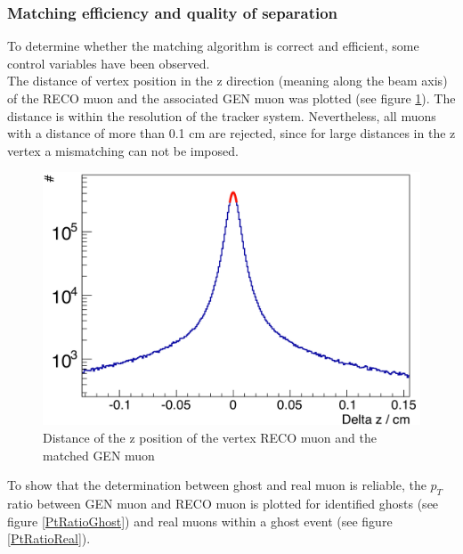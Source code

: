 \subsubsection{Matching efficiency and quality of separation}
To determine whether the matching algorithm is correct and efficient, some control variables have been observed.\\
The distance of vertex position in the z direction (meaning along the beam axis) of the RECO muon and the associated GEN muon was plotted (see figure \ref{DeltaZMatching}). The distance is within the resolution of the tracker system. Nevertheless, all muons with a distance of more than 0.1 cm are rejected, since for large distances in the z vertex a mismatching can not be imposed.\\
\begin{figure}[b]
\centering
\begin{minipage}[t]{0.95\textwidth}
\includegraphics[width=\textwidth]{Figures/scheuch/DeltaZ.png}
\caption{Distance of the z position of the vertex RECO muon and the matched GEN muon}
\label{DeltaZMatching}
\end{minipage}
\end{figure}
To show that the determination between ghost and real muon is reliable, the $p_{T}$ ratio between GEN muon and RECO muon is plotted for identified ghosts (see figure \ref{PtRatioGhost}) and real muons within a ghost event (see figure \ref{PtRatioReal}).
